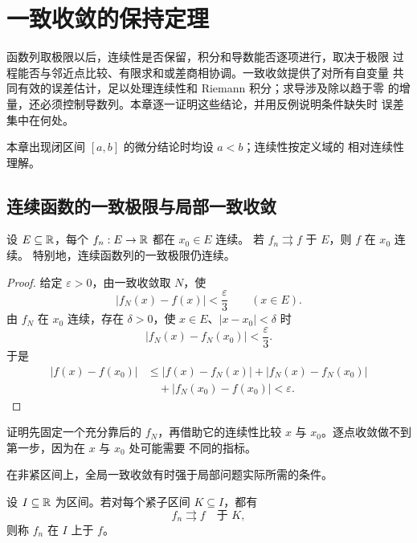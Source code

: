 \chapter{一致收敛的保持定理}
\label{chap:uniform-convergence-preservation}

函数列取极限以后，连续性是否保留，积分和导数能否逐项进行，取决于极限
过程能否与邻近点比较、有限求和或差商相协调。一致收敛提供了对所有自变量
共同有效的误差估计，足以处理连续性和 Riemann 积分；求导涉及除以趋于零
的增量，还必须控制导数列。本章逐一证明这些结论，并用反例说明条件缺失时
误差集中在何处。

本章出现闭区间 \([a,b]\) 的微分结论时均设 \(a<b\)；连续性按定义域的
相对连续性理解。

\section{连续函数的一致极限与局部一致收敛}

\begin{theorem}[一致极限保持连续性]
\label{thm:uniform-limit-continuous}
设 \(E\subseteq\mathbb{R}\)，每个 \(f_n:E\to\mathbb{R}\) 都在 \(x_0\in E\) 连续。
若 \(f_n\rightrightarrows f\) 于 \(E\)，则 \(f\) 在 \(x_0\) 连续。
特别地，连续函数列的一致极限仍连续。
\end{theorem}

\begin{proof}
给定 \(\varepsilon>0\)，由一致收敛取 \(N\)，使
\[
 |f_N(x)-f(x)|<\frac{\varepsilon}{3}
 \qquad(x\in E).
\]
由 \(f_N\) 在 \(x_0\) 连续，存在 \(\delta>0\)，使
\(x\in E\)、\(|x-x_0|<\delta\) 时
\[
 |f_N(x)-f_N(x_0)|<\frac{\varepsilon}{3}.
\]
于是
\[
\begin{aligned}
 |f(x)-f(x_0)|
 &\le |f(x)-f_N(x)|+|f_N(x)-f_N(x_0)|\\
 &\quad+|f_N(x_0)-f(x_0)|<\varepsilon.
\end{aligned}
\]
\end{proof}

证明先固定一个充分靠后的 \(f_N\)，再借助它的连续性比较 \(x\) 与
\(x_0\)。逐点收敛做不到第一步，因为在 \(x\) 与 \(x_0\) 处可能需要
不同的指标。

在非紧区间上，全局一致收敛有时强于局部问题实际所需的条件。

\begin{definition}[局部一致收敛]
设 \(I\subseteq\mathbb{R}\) 为区间。若对每个紧子区间 \(K\subseteq I\)，都有
\[
 f_n\rightrightarrows f\quad\text{于 }K,
\]
则称 \(f_n\) 在 \(I\) 上于 \(f\)。
\end{definition}

